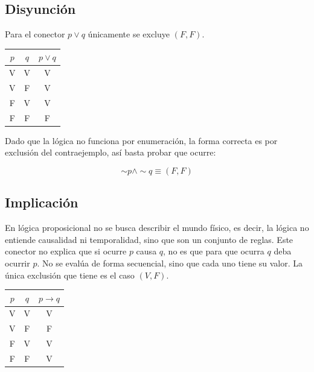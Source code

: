   \subsection{Disyunción}

  \begin{minipage}[t]{0.48\textwidth}
  \begin{definition}[title={Disyunción}]
  Para el conector $p \lor q$ únicamente se excluye $(F, F)$.
  \end{definition}
  \end{minipage}

  \begin{minipage}[t]{0.48\textwidth}
  \begin{tabular}{c|c|c}
  $p$ & $q$ & $p \lor q$ \\
  \hline
  V & V & V \\
  V & F & V \\
  F & V & V \\
  F & F & F \\
  \end{tabular}
  \end{minipage}

  Dado que la lógica no funciona por enumeración, la forma correcta es
  por exclusión del contraejemplo, así basta probar que ocurre:

  \begin{equation}
  \sim p \land \sim q \equiv (F, F)
  \end{equation}

  \subsection{Implicación}

  \begin{minipage}[t]{0.48\textwidth}
  \begin{definition}[title={Implicación}]
  En lógica proposicional no se busca describir el mundo físico, es decir,
  la lógica no entiende causalidad ni temporalidad, sino que son un
  conjunto de reglas. Este conector no explica que si ocurre $p$ causa $q$,
  no es que para que ocurra $q$ deba ocurrir $p$. No se evalúa de forma
  secuencial, sino que cada uno tiene su valor. La única exclusión que
  tiene es el caso $(V, F)$.
  \end{definition}
  \end{minipage}

  \begin{minipage}[t]{0.48\textwidth}
  \begin{tabular}{c|c|c}
  $p$ & $q$ & $p \to q$ \\
  \hline
  V & V & V \\
  V & F & F \\
  F & V & V \\
  F & F & V \\
  \end{tabular}
  \end{minipage}

